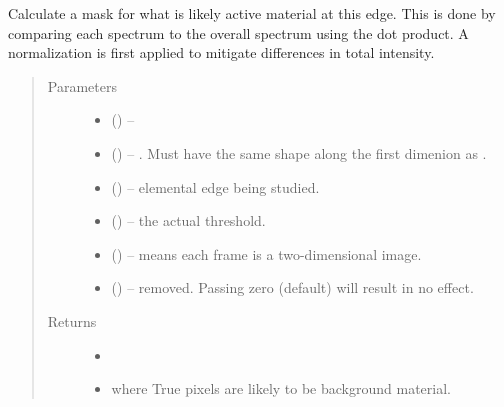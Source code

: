 \documentclass[letterpaper,10pt,english]{sphinxmanual}
\begin{document}
\begin{fulllineitems}
\label{\detokenize{xanespy:xanespy.xanes_math.l_edge_mask}}
Calculate a mask for what is likely active material at this
edge. This is done by comparing each spectrum to the overall
spectrum using the dot product. A normalization is first applied
to mitigate differences in total intensity.
\begin{quote}\begin{description}
\item[{Parameters}] \leavevmode\begin{itemize}
\item {} 
 (\sphinxstyleliteralemphasis{-}) -- 

\item {} 
 (\sphinxstyleliteralemphasis{-}) -- . Must have the same shape along the first dimenion as
.

\item {} 
 (\sphinxstyleliteralemphasis{-}) -- elemental edge being studied.

\item {} 
 (\sphinxstyleliteralemphasis{-}) -- the actual threshold.

\item {} 
 (\sphinxstyleliteralemphasis{-}) -- means each frame is a two-dimensional image.

\item {} 
 (\sphinxstyleliteralemphasis{-}) -- removed. Passing zero (default) will result in no effect.

\end{itemize}

\item[{Returns}] \leavevmode
\begin{itemize}
\item {} 

\item {} 
 where True pixels are likely to be background material.

\end{itemize}


\end{description}\end{quote}

\end{fulllineitems}
\end{document}
